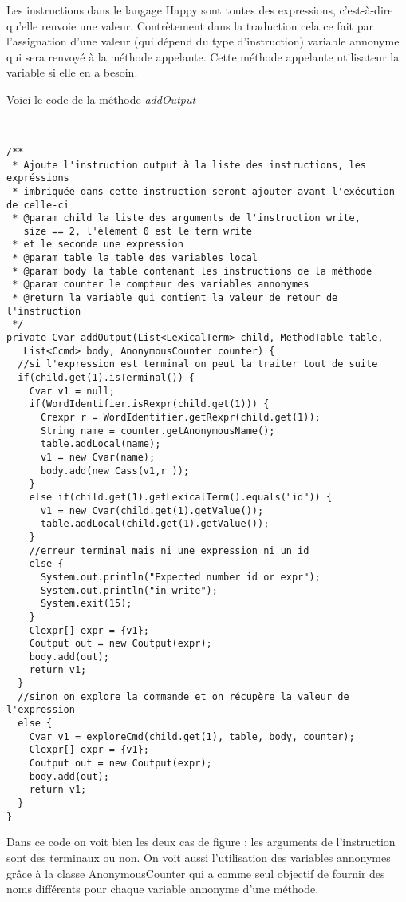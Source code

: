 Les instructions dans le langage Happy sont toutes des expressions, c'est-à-dire qu'elle renvoie une valeur. Contrètement dans la traduction
cela ce fait par l'assignation d'une valeur (qui dépend du type d'instruction) variable annonyme qui sera renvoyé à la méthode appelante. Cette méthode
appelante utilisateur la variable si elle en a besoin.

Voici le code de la méthode \textit{addOutput}

\begin{verbatim}

 
/**
 * Ajoute l'instruction output à la liste des instructions, les expréssions
 * imbriquée dans cette instruction seront ajouter avant l'exécution de celle-ci
 * @param child la liste des arguments de l'instruction write, 
   size == 2, l'élément 0 est le term write
 * et le seconde une expression
 * @param table la table des variables local
 * @param body la table contenant les instructions de la méthode 
 * @param counter le compteur des variables annonymes
 * @return la variable qui contient la valeur de retour de l'instruction
 */
private Cvar addOutput(List<LexicalTerm> child, MethodTable table,
   List<Ccmd> body, AnonymousCounter counter) {
  //si l'expression est terminal on peut la traiter tout de suite
  if(child.get(1).isTerminal()) {
    Cvar v1 = null;
    if(WordIdentifier.isRexpr(child.get(1))) {
      Crexpr r = WordIdentifier.getRexpr(child.get(1)); 
      String name = counter.getAnonymousName(); 
      table.addLocal(name);
      v1 = new Cvar(name);				
      body.add(new Cass(v1,r ));
    }
    else if(child.get(1).getLexicalTerm().equals("id")) {
      v1 = new Cvar(child.get(1).getValue());
      table.addLocal(child.get(1).getValue());
    }
    //erreur terminal mais ni une expression ni un id
    else {
      System.out.println("Expected number id or expr");
      System.out.println("in write");
      System.exit(15);
    }
    Clexpr[] expr = {v1};
    Coutput out = new Coutput(expr);
    body.add(out);
    return v1;
  }
  //sinon on explore la commande et on récupère la valeur de l'expression
  else {
    Cvar v1 = exploreCmd(child.get(1), table, body, counter);
    Clexpr[] expr = {v1};
    Coutput out = new Coutput(expr);
    body.add(out);
    return v1;
  }
}
 \end{verbatim}

Dans ce code on voit bien les deux cas de figure : les arguments de l'instruction sont des terminaux ou non. 
On voit aussi l'utilisation des variables annonymes grâce à la classe AnonymousCounter qui a comme seul objectif de fournir des noms différents
pour chaque variable annonyme d'une méthode. 


